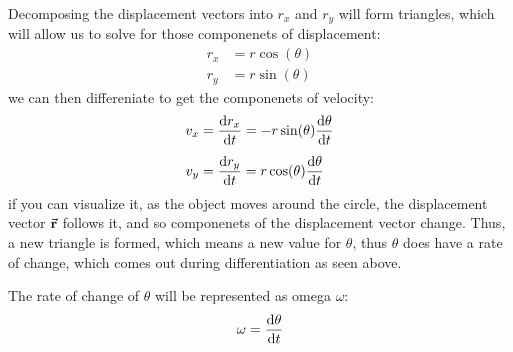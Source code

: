 \documentclass{article}
\begin{document}
Decomposing the displacement vectors into $r_x$ and $r_y$ will form triangles, which will allow
us to solve for those componenets of displacement:
\begin{align*}
    r_x &= r\cos(\theta) \\
    r_y &= r\sin(\theta)
\end{align*}
we can then differeniate to get the componenets of velocity:
\begin{align*}
    v_x &= \derivative{r_x}{t} = -r\sin(\theta) \derivative{\theta}{t} \\[1ex]
    v_y &= \derivative{r_y}{t} = r\cos(\theta) \derivative{\theta}{t} \\
\end{align*}
if you can visualize it, as the object moves around the circle, the displacement vector
$\va{r}$ follows it, and so componenets of the displacement vector change. Thus, a new 
triangle is formed, which means a new value for $\theta$, thus $\theta$ does have a rate 
of change, which comes out during differentiation as seen above.

The rate of change of $\theta$ will be represented as omega $\omega$:
\[ \omega = \derivative{\theta}{t} \]
\end{document}
